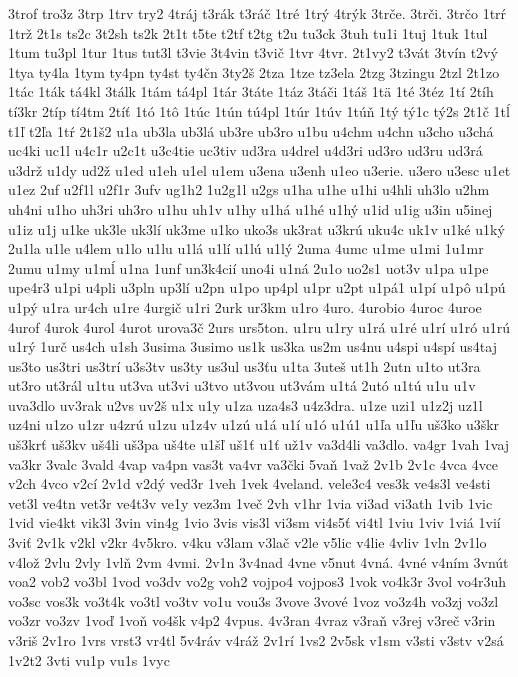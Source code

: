 {3trof
tro3z
3trp
1trv
try2
4tráj
t3rák
t3ráč
1tré
1trý
4trýk
3trče.
3trči.
3trčo
1trŕ
1trž
2t1s
ts2c
3t2sh
ts2k
2t1t
t5te
t2tf
t2tg
t2u
tu3ck
3tuh
tu1i
1tuj
1tuk
1tul
1tum
tu3pl
1tur
1tus
tut3l
t3vie
3t4vin
t3vič
1tvr
4tvr.
2t1vy2
t3vát
3tvín
t2vý
1tya
ty4la
1tym
ty4pn
ty4st
ty4čn
3ty2š
2tza
1tze
tz3ela
2tzg
3tzingu
2tzl
2t1zo
1tác
1ták
tá4kl
3tálk
1tám
tá4pl
1tár
3táte
1táz
3táči
1táš
1tä
1té
3téz
1tí
2tíh
tí3kr
2típ
tí4tm
2tíť
1tó
1tô
1túc
1tún
tú4pl
1túr
1túv
1túň
1tý
tý1c
tý2s
2t1č
1tĺ
t1ľ
t2ľa
1tŕ
2t1š2
u1a
ub3la
ub3lá
ub3re
ub3ro
u1bu
u4chm
u4chn
u3cho
u3chá
uc4ki
uc1l
u4c1r
u2c1t
u3c4tie
uc3tiv
ud3ra
u4drel
u4d3ri
ud3ro
ud3ru
ud3rá
u3drž
u1dy
ud2ž
u1ed
u1eh
u1el
u1em
u3ena
u3enh
u1eo
u3erie.
u3ero
u3esc
u1et
u1ez
2uf
u2f1l
u2f1r
3ufv
ug1h2
1u2g1l
u2gs
u1ha
u1he
u1hi
u4hli
uh3lo
u2hm
uh4ni
u1ho
uh3ri
uh3ro
u1hu
uh1v
u1hy
u1há
u1hé
u1hý
u1id
u1ig
u3in
u5inej
u1iz
u1j
u1ke
uk3le
uk3lí
uk3me
u1ko
uko3s
uk3rat
u3krú
uku4c
uk1v
u1ké
u1ký
2u1la
u1le
u4lem
u1lo
u1lu
u1lá
u1lí
u1lú
u1lý
2uma
4umc
u1me
u1mi
1u1mr
2umu
u1my
u1mĺ
u1na
1unf
un3k4cií
uno4i
u1ná
2u1o
uo2s1
uot3v
u1pa
u1pe
upe4r3
u1pi
u4pli
u3pln
up3lí
u2pn
u1po
up4pl
u1pr
u2pt
u1pá1
u1pí
u1pô
u1pú
u1pý
u1ra
ur4ch
u1re
4urgič
u1ri
2urk
ur3km
u1ro
4uro.
4urobio
4uroc
4uroe
4urof
4urok
4urol
4urot
urova3č
2urs
urs5ton.
u1ru
u1ry
u1rá
u1ré
u1rí
u1ró
u1rú
u1rý
1urč
us4ch
u1sh
3usima
3usimo
us1k
us3ka
us2m
us4nu
u4spi
u4spí
us4taj
us3to
us3tri
us3trí
u3s3tv
us3ty
us3ul
us3ťu
u1ta
3uteš
ut1h
2utn
u1to
ut3ra
ut3ro
ut3rál
u1tu
ut3va
ut3vi
u3tvo
ut3vou
ut3vám
u1tá
2utó
u1tú
u1u
u1v
uva3dlo
uv3rak
u2vs
uv2š
u1x
u1y
u1za
uza4s3
u4z3dra.
u1ze
uzi1
u1z2j
uz1l
uz4ni
u1zo
u1zr
u4zrú
u1zu
u1z4v
u1zú
u1á
u1í
u1ó
u1ú1
u1ľa
u1ľu
uš3ko
u3škr
uš3krť
uš3kv
uš4li
uš3pa
uš4te
u1šľ
uš1ť
u1ť
už1v
va3d4li
va3dlo.
va4gr
1vah
1vaj
va3kr
3valc
3vald
4vap
va4pn
vas3t
va4vr
va3čki
5vaň
1važ
2v1b
2v1c
4vca
4vce
v2ch
4vco
v2cí
2v1d
v2dý
ved3r
1veh
1vek
4veland.
vele3c4
ves3k
ve4s3l
ve4sti
vet3l
ve4tn
vet3r
ve4t3v
ve1y
vez3m
1več
2vh
v1hr
1via
vi3ad
vi3ath
1vib
1vic
1vid
vie4kt
vik3l
3vin
vin4g
1vio
3vis
vis3l
vi3sm
vi4s5ť
vi4tl
1viu
1viv
1viá
1vií
3viť
2v1k
v2kl
v2kr
4v5kro.
v4ku
v3lam
v3lač
v2le
v5lic
v4lie
4vliv
1vln
2v1lo
v4lož
2vlu
2vly
1vlň
2vm
4vmi.
2v1n
3v4nad
4vne
v5nut
4vná.
4vné
v4ním
3vnút
voa2
vob2
vo3bl
1vod
vo3dv
vo2g
voh2
vojpo4
vojpos3
1vok
vo4k3r
3vol
vo4r3uh
vo3sc
vos3k
vo3t4k
vo3tl
vo3tv
vo1u
vou3s
3vove
3vové
1voz
vo3z4h
vo3zj
vo3zl
vo3zr
vo3zv
1voď
1voň
vo4šk
v4p2
4vpus.
4v3ran
4vraz
v3raň
v3rej
v3reč
v3rin
v3riš
2v1ro
1vrs
vrst3
vr4tl
5v4ráv
v4ráž
2v1rí
1vs2
2v5sk
v1sm
v3sti
v3stv
v2sá
1v2t2
3vti
vu1p
vu1s
1vyc
}
